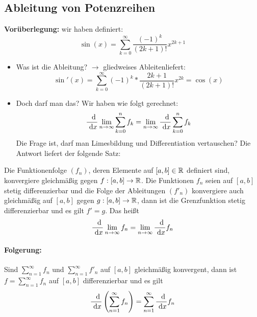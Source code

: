 \subsection{Ableitung von Potenzreihen}
\textbf{Vorüberlegung:} wir haben definiert:
\begin{equation*}
	\sin(x)=\sum\limits_{k=0}^\infty \frac{(-1)^k}{(2k+1)!}x^{2k+1}
\end{equation*}
\begin{itemize}
	\item Was ist die Ableitung? $\rightarrow$ \glqq gliedweises Ableiten\grqq liefert:
	\begin{equation*}
		\sin'(x)=\sum\limits_{k=0}^\infty (-1)^k *\frac{2k+1}{(2k+1)!}x^{2k}=\cos(x)
	\end{equation*}
	\item Doch darf man das? Wir haben wie folgt gerechnet:
	\begin{equation*}
		\frac{\ \operatorname{d}\!}{\ \operatorname{d}\! x}\lim\limits_{n\to\infty}\sum\limits_{k=0}^n f_k
		=\lim\limits_{n\to\infty} \frac{\ \operatorname{d}\!}{\ \operatorname{d}\! x}\sum\limits_{k=0}^n f_k
	\end{equation*}
	Die Frage ist, darf man Limesbildung und Differentiation vertauschen? Die Antwort liefert der folgende Satz:
\end{itemize}
\begin{satz}{}
	Die Funktionenfolge $(f_n)$, deren Elemente auf $[a,b]\in\mathbb{R}$ definiert sind, konvergiere gleichmäßig gegen $f:[a,b]\rightarrow\mathbb{R}$. Die Funktionen $f_n$ seien auf $[a,b]$ stetig differenzierbar und die Folge der Ableitungen $(f'_n)$ konvergiere auch gleichmäßig auf $[a,b]$ gegen $g:[a,b]\rightarrow\mathbb{R}$, dann ist die Grenzfunktion stetig differenzierbar und es gilt $f'=g$. Das heißt
	\begin{equation*}
		\frac{\ \operatorname{d}\!}{\ \operatorname{d}\! x}\lim\limits_{n\to\infty} f_n = \lim\limits_{n\to\infty}\frac{\ \operatorname{d}\!}{\ \operatorname{d}\! x} f_n
	\end{equation*}
\end{satz}

\paragraph{Folgerung:}
Sind $\sum^\infty_{n=1} f_n$ und $\sum^\infty_{n=1} f'_n$ auf $[a,b]$ gleichmäßig konvergent, dann ist $f=\sum^\infty_{n=1} f_n$ auf $[a,b]$ differenzierbar und es gilt
\begin{equation*}
	\frac{\ \operatorname{d}\!}{\ \operatorname{d}\! x}\left(\sum^\infty_{n=1} f_n\right)=\sum^\infty_{n=1} \frac{\ \operatorname{d}\!}{\ \operatorname{d}\! x}f_n
\end{equation*}

